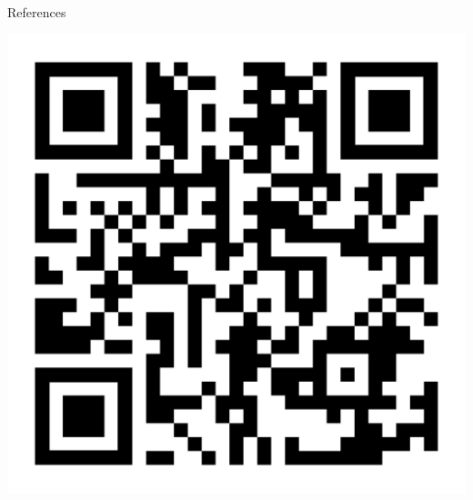 \documentclass[compress,10pt,xcolor={table,dvipsnames},t]{beamer} %
\begin{document}
	\BackgroundBiblio
	
	{ 	
	\begin{frame}{References}
		\scriptsize
		

		\flushright
		\begin{minipage}{0.05\linewidth}
			\flushright
		\end{minipage} \; \begin{minipage}{0.28\linewidth}
		\includegraphics[width=\linewidth]{images/qrcode_paper.pdf}
		\end{minipage}
	\end{frame}
	}
	\addtocounter{framenumber}{-1} 
	
	\Background

	
	\appendix
	
	
	
\end{document}
